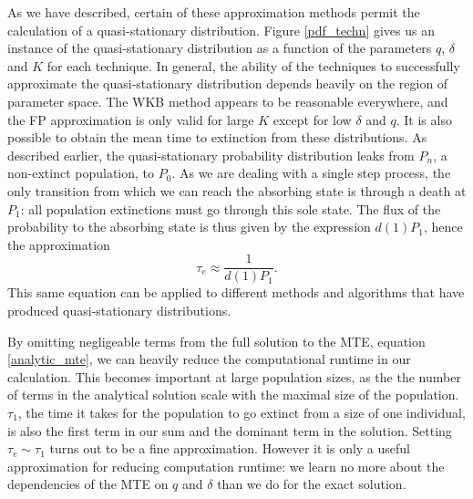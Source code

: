 As we have described, certain of these approximation methods permit the calculation of a quasi-stationary distribution. 
Figure \ref{pdf_techn} gives us an instance of the quasi-stationary distribution as a function of the parameters $q$, $\delta$ and $K$ for each technique. 
In general, the ability of the techniques to successfully approximate the quasi-stationary distribution depends heavily on the region of parameter space. 
The WKB method appears to be reasonable everywhere, and the FP approximation is only valid for large $K$ except for low $\delta$ and $q$. %
It is also possible to obtain the mean time to extinction from these distributions.
As described earlier, the quasi-stationary probability distribution leaks from $P_n$, a non-extinct population, to $P_0$.
As we are dealing with a single step process, the only transition from which we can reach the absorbing state is through a death at $P_1$: all population extinctions must go through this sole state.
The flux of the probability to the absorbing state is thus given by the expression $d(1)P_1$, hence the approximation \cite{textbooks,WKB paper(Assaf2016?)}
\begin{equation}
\tau_e \approx \frac{1}{d(1)P_1}.
\label{1overd1P1}
\end{equation}
This same equation can be applied to different methods and algorithms that have produced quasi-stationary distributions. %

By omitting negligeable terms from the full solution to the MTE, equation \ref{analytic_mte}, we can heavily reduce the computational runtime in our calculation.
This becomes important at large population sizes, as the the number of terms in the analytical solution scale with the maximal size of the population.
$\tau_1$, the time it takes for the population to go extinct from a size of one individual, is also the first term in our sum and the dominant term in the solution.
Setting $\tau_e \sim \tau_1$ turns out to be a fine approximation.
However it is only a useful approximation for reducing computation runtime: we learn no more about the dependencies of the MTE on $q$ and $\delta$ than we do for the exact solution. 

